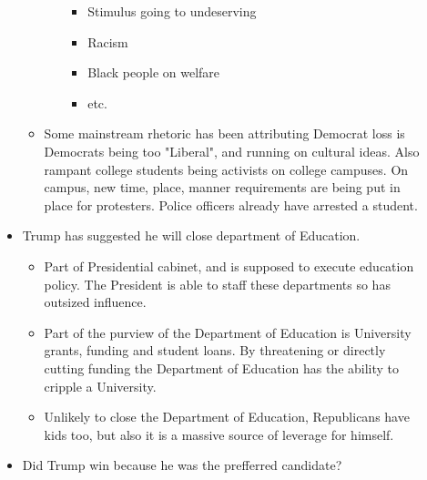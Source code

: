 \documentclass{report}
\begin{document}
\begin{description}
\begin{itemize}
\begin{itemize}
\begin{itemize}
                                \begin{itemize}
                                    \item Stimulus going to
                                        undeserving
                                    \item Racism
                                    \item Black people on welfare
                                    \item etc.
                                \end{itemize}
                        \end{itemize}
                    \item Some mainstream rhetoric has been
                        attributing Democrat loss is Democrats
                        being too "Liberal", and running on
                        cultural ideas. Also rampant college
                        students being activists on college
                        campuses. On campus, new time, place, manner 
                        requirements are being put in place
                        for protesters. Police officers already
                        have arrested a student.
                \end{itemize}
            \item Trump has suggested he will close department
                of Education.
                \begin{itemize}
                    \item Part of Presidential cabinet, and
                        is supposed to execute education policy.
                        The President is able to staff these
                        departments so has outsized influence.
                    \item Part of the purview of the Department
                        of Education is University grants, funding
                        and student loans. By threatening or directly
                        cutting funding the Department of Education
                        has the ability to cripple a University.
                    \item Unlikely to close the Department of Education,
                        Republicans have kids too, but also it is
                        a massive source of leverage for himself.
                \end{itemize}
            \item Did Trump win because he was the prefferred candidate?

\end{itemize}
\end{description}
\end{document}
